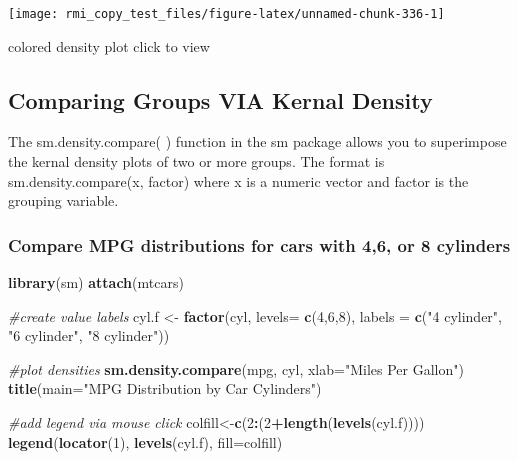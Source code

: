 \documentclass[]{book}
\newenvironment{Shaded}{\begin{snugshade}}{\end{snugshade}}
\newcommand{\CommentTok}[1]{\textcolor[rgb]{0.56,0.35,0.01}{\textit{#1}}}
\newcommand{\DataTypeTok}[1]{\textcolor[rgb]{0.13,0.29,0.53}{#1}}
\newcommand{\DecValTok}[1]{\textcolor[rgb]{0.00,0.00,0.81}{#1}}
\newcommand{\KeywordTok}[1]{\textcolor[rgb]{0.13,0.29,0.53}{\textbf{#1}}}
\newcommand{\NormalTok}[1]{#1}
\newcommand{\OperatorTok}[1]{\textcolor[rgb]{0.81,0.36,0.00}{\textbf{#1}}}
\newcommand{\StringTok}[1]{\textcolor[rgb]{0.31,0.60,0.02}{#1}}
\theoremstyle{definition}
\theoremstyle{definition}
\theoremstyle{definition}
\theoremstyle{remark}
\begin{document}
\begin{center}\texttt{[image: rmi\_copy\_test\_files/figure-latex/unnamed-chunk-336-1]} \end{center}

colored density plot click to view

\hypertarget{comparing-groups-via-kernal-density}{%
\subsection{Comparing Groups VIA Kernal
Density}\label{comparing-groups-via-kernal-density}}

The sm.density.compare( ) function in the sm package allows you to
superimpose the kernal density plots of two or more groups. The format
is sm.density.compare(x, factor) where x is a numeric vector and factor
is the grouping variable.

\hypertarget{compare-mpg-distributions-for-cars-with-46-or-8-cylinders}{%
\subsubsection{Compare MPG distributions for cars with 4,6, or 8
cylinders}\label{compare-mpg-distributions-for-cars-with-46-or-8-cylinders}}

\begin{Shaded}
\begin{Highlighting}[]
\KeywordTok{library}\NormalTok{(sm)}
\KeywordTok{attach}\NormalTok{(mtcars)}

\CommentTok{#create value labels }
\NormalTok{cyl.f <-}\StringTok{ }\KeywordTok{factor}\NormalTok{(cyl, }\DataTypeTok{levels=} \KeywordTok{c}\NormalTok{(}\DecValTok{4}\NormalTok{,}\DecValTok{6}\NormalTok{,}\DecValTok{8}\NormalTok{),}
  \DataTypeTok{labels =} \KeywordTok{c}\NormalTok{(}\StringTok{"4 cylinder"}\NormalTok{, }\StringTok{"6 cylinder"}\NormalTok{, }\StringTok{"8 cylinder"}\NormalTok{)) }

\CommentTok{#plot densities }
\KeywordTok{sm.density.compare}\NormalTok{(mpg, cyl, }\DataTypeTok{xlab=}\StringTok{"Miles Per Gallon"}\NormalTok{)}
\KeywordTok{title}\NormalTok{(}\DataTypeTok{main=}\StringTok{"MPG Distribution by Car Cylinders"}\NormalTok{)}

\CommentTok{#add legend via mouse click}
\NormalTok{colfill<-}\KeywordTok{c}\NormalTok{(}\DecValTok{2}\OperatorTok{:}\NormalTok{(}\DecValTok{2}\OperatorTok{+}\KeywordTok{length}\NormalTok{(}\KeywordTok{levels}\NormalTok{(cyl.f)))) }
\KeywordTok{legend}\NormalTok{(}\KeywordTok{locator}\NormalTok{(}\DecValTok{1}\NormalTok{), }\KeywordTok{levels}\NormalTok{(cyl.f), }\DataTypeTok{fill=}\NormalTok{colfill)}
\end{Highlighting}
\end{Shaded}
\end{document}
